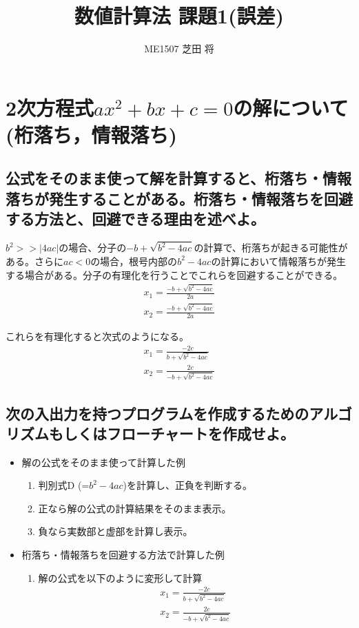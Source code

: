 \documentclass[]{jsarticle}
\title{\LARGE {数値計算法 課題1(誤差)}}
\author{\large {ME1507 芝田 将}}
\begin{document}
\maketitle

\section{2次方程式$ax^{2}+bx+c=0$の解について(桁落ち，情報落ち)}

\subsection{公式をそのまま使って解を計算すると、桁落ち・情報落ちが発生することがある。桁落ち・情報落ちを回避する方法と、回避できる理由を述べよ。}

$b^{2} >> |4ac|$の場合、分子の$-b + \sqrt{b^{2}-4ac}$の計算で、桁落ちが起きる可能性がある。さらに$ac<0$の場合，根号内部の$b^{2}-4ac$の計算において情報落ちが発生する場合がある。分子の有理化を行うことでこれらを回避することができる。
\begin{eqnarray}
x_{1} = \frac{-b + \sqrt{b^{2}-4ac}}{2a} \\
x_{2} = \frac{-b + \sqrt{b^{2}-4ac}}{2a}
\end{eqnarray}

これらを有理化すると次式のようになる。
\begin{eqnarray}
x_{1} = \frac{-2c}{b+\sqrt{b^{2}-4ac}} \\
x_{2} = \frac{2c}{-b+\sqrt{b^{2}-4ac}}
\end{eqnarray}


\subsection{次の入出力を持つプログラムを作成するためのアルゴリズムもしくはフローチャートを作成せよ。}

\begin{itemize}
\item 解の公式をそのまま使って計算した例
\begin{enumerate}
\item 判別式D (=$b^{2}-4ac$)を計算し、正負を判断する。
\item 正なら解の公式の計算結果をそのまま表示。
\item 負なら実数部と虚部を計算し表示。
\end{enumerate}

\item 桁落ち・情報落ちを回避する方法で計算した例
\begin{enumerate}
\item 解の公式を以下のように変形して計算
\begin{eqnarray}
x_{1} = \frac{-2c}{b+\sqrt{b^{2}-4ac}} \\
x_{2} = \frac{2c}{-b+\sqrt{b^{2}-4ac}}
\end{eqnarray}

\end{enumerate}

\end{itemize}
\end{document}
